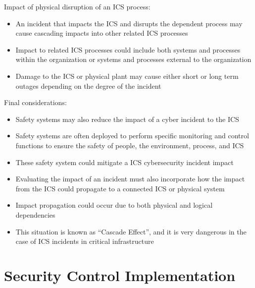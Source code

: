 Impact of physical disruption of an ICS process:
\begin{itemize}
	\item An incident that impacts the ICS and disrupts the dependent process may
cause cascading impacts into other related ICS processes
	\item Impact to related ICS processes could include both systems and processes
within the organization or systems and processes external to the
organization
	\item Damage to the ICS or physical plant may cause either short or long term
outages depending on the degree of the incident
\end{itemize}

Final considerations:
\begin{itemize}
	\item Safety systems may also reduce the impact of a cyber incident to the ICS
	\item Safety systems are often deployed to perform specific monitoring and
control functions to ensure the safety of people, the environment, process,
and ICS
	\item These safety system could mitigate a ICS cybersecurity incident impact
	\item Evaluating the impact of an incident must also incorporate how the impact
from the ICS could propagate to a connected ICS or physical system
	\item Impact propagation could occur due to both physical and logical
dependencies
	\item This situation is known as “Cascade Effect”, and it is very dangerous in the
case of ICS incidents in critical infrastructure
\end{itemize}


\section{Security Control Implementation}


